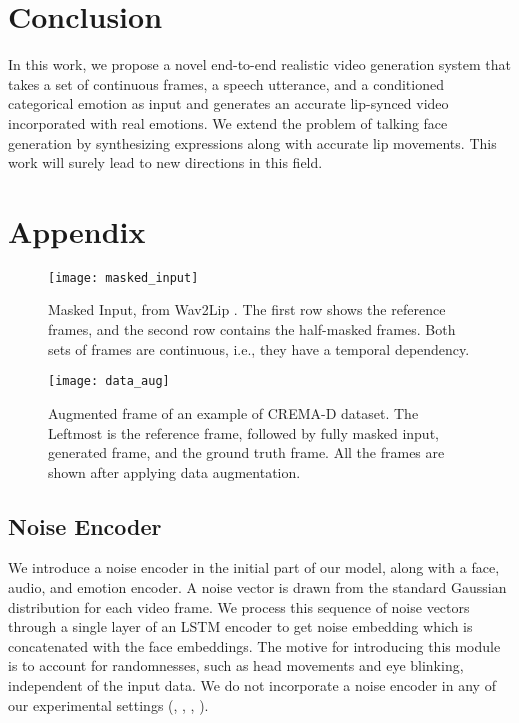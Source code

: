 \documentclass[accepted]{uai2023}
\begin{document}
\section{Conclusion}
In this work, we propose a novel end-to-end realistic video generation system that takes a set of continuous frames, a speech utterance, and a conditioned categorical emotion as input and generates an accurate lip-synced video incorporated with real emotions. We extend the problem of talking face generation by synthesizing expressions along with accurate lip movements. This work will surely lead to new directions in this field.











\appendix

\clearpage
\section{Appendix}

\begin{figure}[htp]
    \centering
    \texttt{[image: masked\_input]}
    \caption{Masked Input, from Wav2Lip \cite{prajwal2020lip}. The first row shows the reference frames, and the second row contains the half-masked frames. Both sets of frames are continuous, i.e., they have a temporal dependency.}
    \label{fig:masked_input}
\end{figure}

\begin{figure}[htp]
    \centering
    \texttt{[image: data\_aug]}
    \caption{Augmented frame of an example of CREMA-D \cite{cao2014crema} dataset. The Leftmost is the reference frame, followed by fully masked input, generated frame, and the ground truth frame. All the frames are shown after applying data augmentation.}
    \label{fig:data_aug}
\end{figure} 

\subsection{Noise Encoder}
We introduce a noise encoder in the initial part of our model, along with a face, audio, and emotion encoder. A noise vector is drawn from the standard Gaussian distribution for each video frame. We process this sequence of noise vectors through a single layer of an LSTM \citep{hochreiter1997long} encoder to get noise embedding which is concatenated with the face embeddings. The motive for introducing this module is to account for randomnesses, such as head movements and eye blinking, independent of the input data. We do not incorporate a noise encoder in any of our experimental settings ({}, {}, {}, {}).
\end{document}
